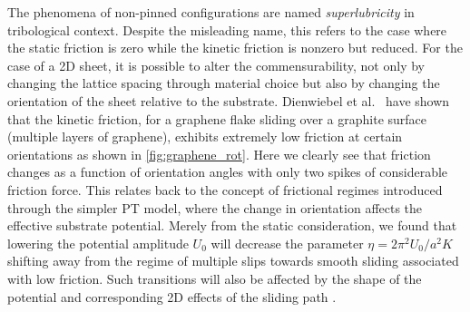 

The phenomena of non-pinned configurations are named \textit{superlubricity} in
tribological context. Despite the misleading name, this refers to the case
where the static friction is zero while the kinetic friction is nonzero but
reduced. For the case of a 2D sheet, it is possible to alter the
commensurability, not only by changing the lattice spacing through material
choice but also by changing the orientation of the sheet relative to the
substrate. Dienwiebel et al.\ \cite{DIENWIEBEL2005197} have shown that the
kinetic friction, for a graphene flake sliding over a graphite surface (multiple
layers of graphene), exhibits extremely low friction at certain orientations as
shown in \cref{fig:graphene_rot}. Here we clearly see that friction changes as a
function of orientation angles with only two spikes of considerable friction
force. This relates back to the concept of frictional regimes introduced through
the simpler \acrshort{PT} model, where the change in orientation affects the
effective substrate potential. Merely from the static consideration, we found that
lowering the potential amplitude $U_0$ will decrease the parameter $\eta =
2\pi^2U_0/a^2K$ shifting away from the regime of multiple slips towards smooth
sliding associated with low friction. Such transitions will also be affected by the shape of the
potential and corresponding 2D effects of the sliding path \cite{Yalin_2011}.

